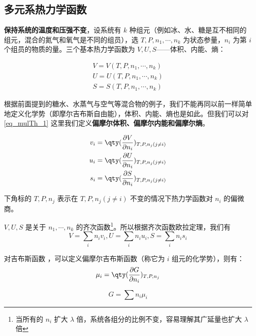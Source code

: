 \subsection{多元系热力学函数}

\textbf{保持系统的温度和压强不变}，设系统有 $k$ 种组元（例如冰、水、糖是互不相同的组元，混合的氮气和氧气是不同的组员），选 $T,P,n_1,\cdots,n_k$ 为状态参量，$n_i$ 为第 $i$ 个组员的物质的量。三个基本热力学函数为 $V,U,S$——体积、内能、熵：

\begin{equation}\label{eq_mulTh_1}
\begin{aligned}
V=V(T,P,n_1,\cdots,n_k)\\
U=U(T,P,n_1,\cdots,n_k)\\
S=S(T,P,n_1,\cdots,n_k)
\end{aligned}
\end{equation}

根据前面提到的糖水、水蒸气与空气等混合物的例子，我们不能再同以前一样简单地定义化学势（即摩尔吉布斯自由能），体积、内能、熵也是如此。但我们可以对\autoref{eq_mulTh_1}  这里我们定义\textbf{偏摩尔体积、偏摩尔内能和偏摩尔熵}。

\begin{equation}
\begin{aligned}
v_i=\qty(\frac{\partial V}{\partial n_i})_{T,P,n_j(j\neq i)}\\
u_i=\qty(\frac{\partial U}{\partial n_i})_{T,P,n_j(j\neq i)}\\
s_i=\qty(\frac{\partial S}{\partial n_i})_{T,P,n_j(j\neq i)}
\end{aligned}
\end{equation}

下角标的 $T,P,n_j$ 表示在 $T,P,n_j(j\neq i)$ 不变的情况下热力学函数对 $n_i$ 的偏微商。

$V,U,S$ 是关于 $n_1,\cdots,n_k$ 的齐次函数\footnote{当所有的 $n_i$ 扩大 $\lambda$ 倍，系统各组分的比例不变，容易理解其广延量也扩大 $\lambda$ 倍}。所以根据齐次函数欧拉定理，我们有
\begin{equation}
V=\sum_i n_iv_i,U=\sum_i n_iu_i,S=\sum_i n_is_i
\end{equation}

对吉布斯函数 ，可以定义偏摩尔吉布斯函数（称它为 $i$ 组元的化学势），则有：
\begin{equation}\label{eq_mulTh_4}
\mu_i=\qty(\frac{\partial G}{\partial n_i})_{T,P,n_j}
\end{equation}

\begin{equation}\label{eq_mulTh_2}
G=\sum n_i \mu_i
\end{equation}

